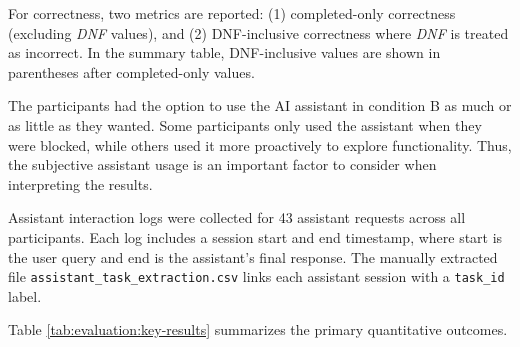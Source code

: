 For correctness, two metrics are reported: (1) completed-only correctness (excluding \textit{DNF} values), and (2) DNF-inclusive correctness where \textit{DNF} is treated as incorrect. In the summary table, DNF-inclusive values are shown in parentheses after completed-only values.

The participants had the option to use the AI assistant in condition B as much or as little as they wanted. Some participants only used the assistant when they were blocked, while others used it more proactively to explore functionality. Thus, the subjective assistant usage is an important factor to consider when interpreting the results.

Assistant interaction logs were collected for 43 assistant requests across all participants. Each log includes a session start and end timestamp, where start is the user query and end is the assistant's final response. The manually extracted file \texttt{assistant\_task\_extraction.csv} links each assistant session with a \texttt{task\_id} label.

Table \ref{tab:evaluation:key-results} summarizes the primary quantitative outcomes.

